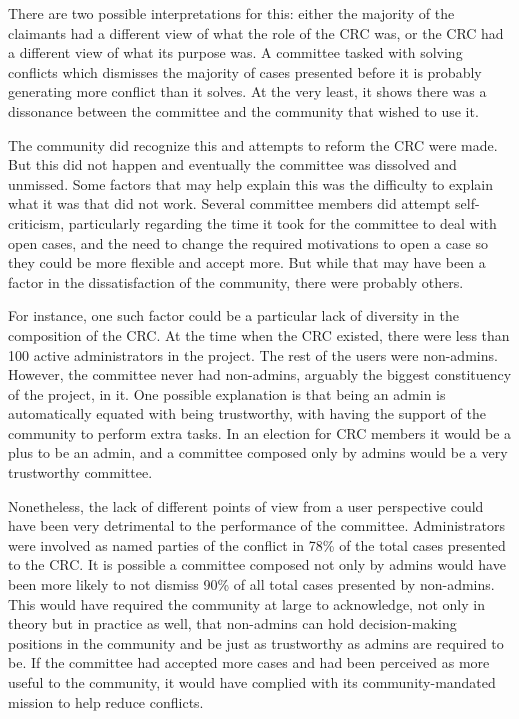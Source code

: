 \documentclass{sigchi}
\begin{document}
There are two possible interpretations for this:
either the majority of the claimants had a different view of what the role of the CRC was, or the
CRC had a different view of what its purpose was. A committee tasked with solving conflicts which
dismisses the majority of cases presented before it is probably generating more conflict than it
solves. At the very least, it shows there was a dissonance between the committee and the community
that wished to use it. 

The community did recognize this and attempts to reform the CRC were made.
But this did not happen and eventually the committee was dissolved and unmissed. Some factors that
may help explain this was the difficulty to explain what it was that did not work. Several
committee members did attempt self-criticism, particularly regarding the time it took for the
committee to deal with open cases, and the need to change the required motivations to open a case
so they could be more flexible and accept more. But while that may have been a factor in the
dissatisfaction of the community, there were probably others. 

For instance, one such factor could
be a particular lack of diversity in the composition of the CRC. At the time when the CRC existed,
there were less than 100 active administrators in the project. The rest of the users were
non-admins. However, the committee never had non-admins, arguably the biggest constituency of the
project, in it. One possible explanation is that being an admin is automatically equated with
being trustworthy, with having the support of the community to perform extra tasks. In an election
for CRC members it would be a plus to be an admin, and a committee composed only by admins would
be a very trustworthy committee. 

Nonetheless, the lack of different points of view from a user perspective
could have been very detrimental to the performance of the committee. Administrators were involved
as named parties of the conflict in 78\% of the total cases presented to the CRC. It is possible a
committee composed not only by admins would have been more likely to not dismiss 90\% of all total
cases presented by non-admins. This would have required the community at large to acknowledge, not
only in theory but in practice as well, that non-admins can hold decision-making positions in the
community and be just as trustworthy as admins are required to be. If the committee had accepted
more cases and had been perceived as more useful to the community, it would have complied with its
community-mandated mission to help reduce conflicts. 
\end{document}
